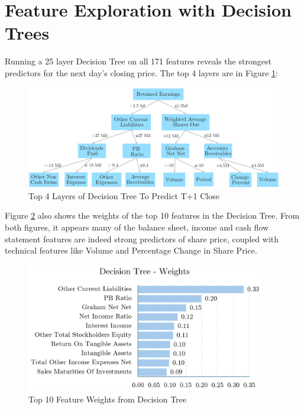 \documentclass[a4paper,12pt]{report}
\numberwithin{equation}{section}
\theoremstyle{definition}
\begin{document}
\section{Feature Exploration with Decision Trees}
Running a 25 layer Decision Tree on all 171 features reveals the strongest predictors for the next day's closing price. The top 4 layers are in Figure \ref{fig:decision_tree_features}:


\begin{figure}[H]
  \centerline{\includegraphics[width=16cm]{feature_decision_tree}}
  \caption{Top 4 Layers of Decision Tree To Predict T+1 Close}
  \label{fig:decision_tree_features}
\end{figure}

Figure \ref{fig:decision_tree_horizontal_graph} also shows the weights of the top 10 features in the Decision Tree. From both figures, it appears many of the balance sheet, income and cash flow statement features are indeed strong predictors of share price, coupled with technical features like Volume and Percentage Change in Share Price. 

\begin{figure}[H]
  \centerline{\includegraphics[width=10.5cm]{decision_tree_horizontal_graph}}
  \caption{Top 10 Feature Weights from Decision Tree}
  \label{fig:decision_tree_horizontal_graph}
\end{figure}
\end{document}
